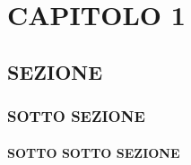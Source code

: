 \chapter{CAPITOLO 1} \label{Cap.1}
\vspace{2cm}

\begin{flushright}
    \textit{\lipsum[1][1-5]}
\end{flushright}

\vspace{0.5cm}



\lipsum[1-5]


\section{SEZIONE}\label{sezione}
\lipsum[6]

\subsection{SOTTO SEZIONE}\label{sottosezione}
\lipsum[7]

\subsubsection{SOTTO SOTTO SEZIONE}\label{sottosottosezione}
\lipsum[8]
